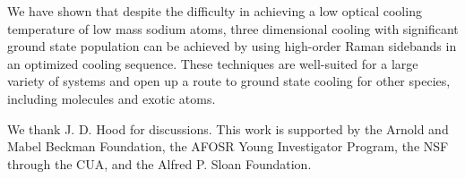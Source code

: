 \documentclass[aps,prl,twocolumn,groupedaddress]{revtex4-1}
\newcommand{\fxnote}[1]{{\textbf{[#1]}}}
\begin{document}

We have shown that despite the difficulty in achieving a low optical cooling temperature
of low mass sodium atoms,  three dimensional cooling
with significant ground state population can be achieved by using high-order Raman sidebands
in an optimized cooling sequence.
These techniques are well-suited for a large variety of systems
and open up a route to ground state cooling for other species, including molecules and exotic atoms.

We thank J. D. Hood for discussions.
This work is supported by the Arnold and Mabel Beckman Foundation, the AFOSR Young Investigator Program, the NSF through the CUA,
and the Alfred P. Sloan Foundation.



\end{document}
